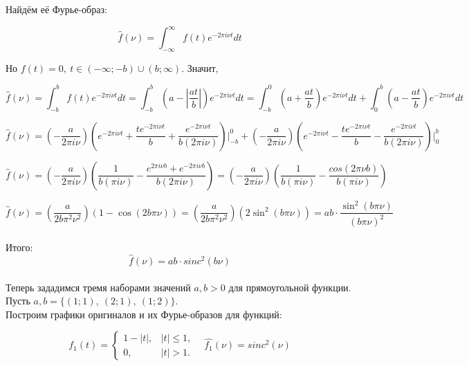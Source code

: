 \documentclass[a4paper, 12pt]{article}
\begin{document}
Найдём её Фурье-образ:

\[
\hat{f}(\nu) = \int^{\infty}_{-\infty} f(t)e^{-2\pi i \nu t}dt
\]

Но $f(t) = 0,\ t\in (-\infty; -b)\cup (b; \infty)$. Значит, 

\[
\hat{f}(\nu) = \int^b_{-b}f(t)e^{-2\pi i \nu t}dt = \int^b_{-b} \left(a - \left| \dfrac{a t}{b} \right|\right)e^{-2\pi i \nu t}dt = \int_{-b}^0\left(a + \frac{a t}{b}\right)e^{-2\pi i \nu t}dt + \int_0^b\left(a - \frac{a t}{b}\right)e^{-2\pi i \nu t}dt
\]

\[
\hat{f}(\nu) = \left( -\frac{a}{2\pi i \nu} \right) \left( e^{-2\pi i \nu t} + \frac{te^{-2\pi i \nu t}}{b} + \frac{e^{-2\pi i \nu t}}{b(2\pi i \nu)} \right)\Bigg|_{-b}^0 
+
\left( -\frac{a}{2\pi i \nu} \right) \left( e^{-2\pi i \nu t} - \frac{te^{-2\pi i \nu t}}{b} - \frac{e^{-2\pi i \nu t}}{b(2\pi i \nu)} \right)\Bigg|_{0}^b
\]


\[
\hat{f}(\nu) 
= 
\left( -\frac{a}{2\pi i \nu}\right) \left(\frac{1}{b(\pi i \nu)} - \frac{e^{2\pi i \nu b} + e^{-2\pi i \nu b}}{b(2\pi i \nu)} \right) 
=
\left( -\frac{a}{2\pi i \nu}\right) \left(\frac{1}{b(\pi i \nu)} - \frac{cos(2\pi \nu b)}{b(\pi i \nu)} \right)
\]

\[
\hat{f}(\nu) =
\left(\frac{a}{2b\pi^2\nu^2} \right) \left( 1 - \cos(2b \pi \nu) \right) = \left(\frac{a}{2b\pi^2\nu^2} \right) \left(2 \sin^2(b\pi\nu)  \right) = ab\cdot \frac{\sin^2(b \pi \nu)}{(b \pi \nu)^2}
\]\\[1pt]

Итого:
\[
\hat{f}(\nu) = ab \cdot sinc^2(b \nu)
\]\\

Теперь зададимся тремя наборами значений $a, b > 0$ для прямоугольной функции. Пусть $a, b = \{(1; 1),\ (2; 1),\ (1;2)\}$.\\

Построим графики оригиналов и их Фурье-образов для функций:

\[
    f_1(t)=
    \begin{cases}
    1 - \left| t \right|, & |t|\leq 1,\\
    0, & |t|>1.
    \end{cases}\ \ \ \
\hat{f_1}(\nu) = sinc^2(\nu)
\]\\[1pt]
\end{document}
